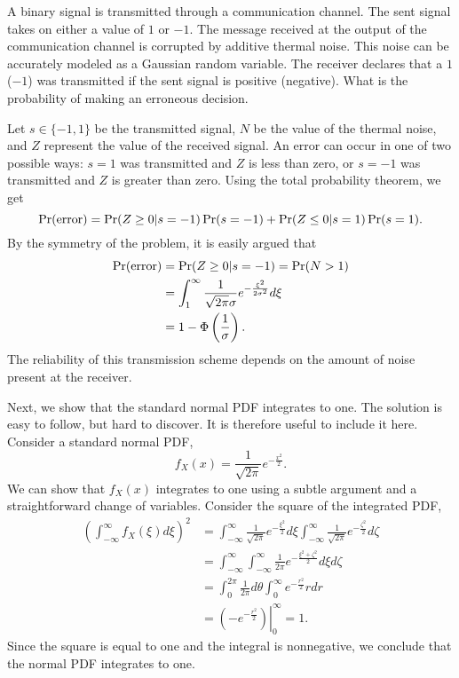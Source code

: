 \begin{example}
A binary signal is transmitted through a communication channel.
The sent signal takes on either a value of $1$ or $-1$.
The message received at the output of the communication channel is corrupted by additive thermal noise.
This noise can be accurately modeled as a Gaussian random variable.
The receiver declares that a $1$ ($-1$) was transmitted if the sent signal is positive (negative).
What is the probability of making an erroneous decision.

Let $s \in \{ -1, 1 \}$ be the transmitted signal, $N$ be the value of the thermal noise, and $Z$ represent the value of the received signal.
An error can occur in one of two possible ways: $s = 1$ was transmitted and $Z$ is less than zero, or $s = -1$ was transmitted and $Z$ is greater than zero.
Using the total probability theorem, we get
\begin{equation*}
\Pr (\text{error}) = \Pr (Z \geq 0 | s = -1) \Pr (s = -1)
+ \Pr (Z \leq 0 | s = 1) \Pr (s = 1).
\end{equation*}
By the symmetry of the problem, it is easily argued that
\begin{equation*}
\begin{split}
\Pr (\text{error}) &= \Pr (Z \geq 0 | s = -1) = \Pr (N > 1) \\
&= \int_{1}^{\infty} \frac{1}{\sqrt{2 \pi} \sigma}
e^{- \frac{\xi^2}{2 \sigma^2}} d\xi \\
&= 1 - \Phi \left( \frac{1}{\sigma} \right) .
\end{split}
\end{equation*}
The reliability of this transmission scheme depends on the amount of noise present at the receiver.
\end{example}

Next, we show that the standard normal PDF integrates to one.
The solution is easy to follow, but hard to discover.
It is therefore useful to include it here.
Consider a standard normal PDF,
\begin{equation*}
f_X(x) = \frac{1}{\sqrt{2 \pi}} e^{- \frac{x^2}{2}} .
\end{equation*}
We can show that $f_X (x)$ integrates to one using a subtle argument and a straightforward change of variables.
Consider the square of the integrated PDF,
\begin{equation*}
\begin{split}
\left(\int_{- \infty}^{\infty} f_X (\xi) d\xi \right)^2
&= \int_{- \infty}^{\infty} \frac{1}{\sqrt{2 \pi}} e^{- \frac{\xi^2}{2}} d\xi
\int_{- \infty}^{\infty} \frac{1}{\sqrt{2 \pi}} e^{- \frac{\zeta^2}{2}} d\zeta \\
&= \int_{- \infty}^{\infty} \int_{- \infty}^{\infty}
\frac{1}{2 \pi} e^{- \frac{\xi^2 + \zeta^2}{2}} d\xi d\zeta \\
&= \int_{0}^{2 \pi} \frac{1}{2 \pi} d\theta
\int_{0}^{\infty} e^{- \frac{r^2}{2}} r dr \\
&= \left. \left( - e^{- \frac{r^2}{2}} \right) \right|_0^{\infty} = 1.
\end{split}
\end{equation*}
Since the square is equal to one and the integral is nonnegative, we conclude that the normal PDF integrates to one.


